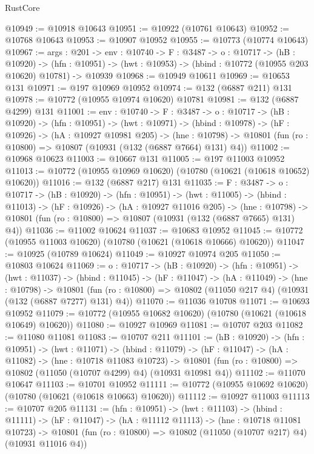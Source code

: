 \begin{lexlean}{RustCore}
\begin{coremodule}
@10949 := @10918 @10643
@10951 := @10922 (@10761 @10643)
@10952 := @10768 @10643
@10953 := @10907 @10952
@10955 := @10773 (@10774 @10643)
@10967 := {args : @201} ->
  {env : @10740} ->
  {F : @3487} ->
  {o : @10717} ->
  (hB : @10920) ->
  (hfn : @10951) -> (hwt : @10953) -> (hbind : @10772 (@10955 @203 @10620) @10781) -> @10939
@10968 := @10949 @10611
@10969 := @10653 @131
@10971 := @197 @10969 @10952
@10974 := @132 (@6887 @211) @131
@10978 := @10772 (@10955 @10974 @10620) @10781
@10981 := @132 (@6887 @4299) @131
@11001 := {env : @10740} ->
  {F : @3487} ->
  {o : @10717} ->
  (hB : @10920) ->
  (hfn : @10951) ->
  (hwt : @10971) ->
  (hbind : @10978) ->
  (hF : @10926) ->
  (hA : @10927 @10981 @205) ->
  (hne : @10798) -> @10801 (fun (ro : @10800) => @10807 (@10931 (@132 (@6887 @7664) @131) @4))
@11002 := @10968 @10623
@11003 := @10667 @131
@11005 := @197 @11003 @10952
@11013 := @10772 (@10955 @10969 @10620) (@10780 (@10621 (@10618 @10652) @10620))
@11016 := @132 (@6887 @217) @131
@11035 := {F : @3487} ->
  {o : @10717} ->
  (hB : @10920) ->
  (hfn : @10951) ->
  (hwt : @11005) ->
  (hbind : @11013) ->
  (hF : @10926) ->
  (hA : @10927 @11016 @205) ->
  (hne : @10798) -> @10801 (fun (ro : @10800) => @10807 (@10931 (@132 (@6887 @7665) @131) @4))
@11036 := @11002 @10624
@11037 := @10683 @10952
@11045 := @10772 (@10955 @11003 @10620) (@10780 (@10621 (@10618 @10666) @10620))
@11047 := @10925 (@10789 @10624)
@11049 := @10927 @10974 @205
@11050 := @10803 @10624
@11069 := {o : @10717} ->
  (hB : @10920) ->
  (hfn : @10951) ->
  (hwt : @11037) ->
  (hbind : @11045) ->
  (hF : @11047) ->
  (hA : @11049) ->
  (hne : @10798) ->
  @10801 (fun (ro : @10800) => @10802 (@11050 @217 @4) (@10931 (@132 (@6887 @7277) @131) @4))
@11070 := @11036 @10708
@11071 := @10693 @10952
@11079 := @10772 (@10955 @10682 @10620) (@10780 (@10621 (@10618 @10649) @10620))
@11080 := @10927 @10969
@11081 := @10707 @203
@11082 := @11080 @11081
@11083 := @10707 @211
@11101 := (hB : @10920) ->
  (hfn : @10951) ->
  (hwt : @11071) ->
  (hbind : @11079) ->
  (hF : @11047) ->
  (hA : @11082) ->
  (hne : @10718 @11083 @10723) ->
  @10801 (fun (ro : @10800) => @10802 (@11050 (@10707 @4299) @4) (@10931 @10981 @4))
@11102 := @11070 @10647
@11103 := @10701 @10952
@11111 := @10772 (@10955 @10692 @10620) (@10780 (@10621 (@10618 @10663) @10620))
@11112 := @10927 @11003
@11113 := @10707 @205
@11131 := (hfn : @10951) ->
  (hwt : @11103) ->
  (hbind : @11111) ->
  (hF : @11047) ->
  (hA : @11112 @11113) ->
  (hne : @10718 @11081 @10723) ->
  @10801 (fun (ro : @10800) => @10802 (@11050 (@10707 @217) @4) (@10931 @11016 @4))

\end{coremodule}
\end{lexlean}

